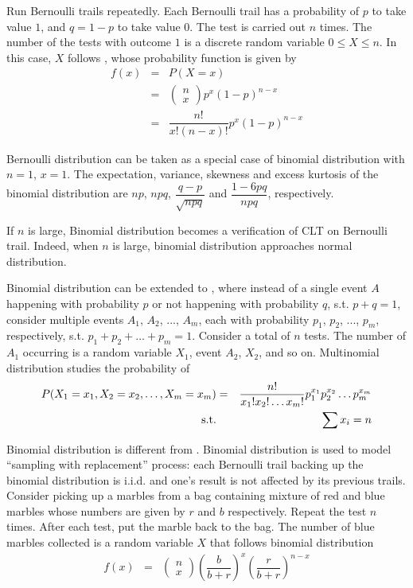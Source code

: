 Run Bernoulli trails repeatedly. Each Bernoulli trail has a probability of $p$ to take value $1$, and $q=1-p$ to take value $0$. The test is carried out $n$ times. The number of the tests with outcome $1$ is a discrete random variable $0\leq X \leq n$. In this case, $X$ follows , whose probability function is given by
\begin{eqnarray}
  f(x) &=& P(X=x) \nonumber \\
  &=& \left(\begin{array}{c}
              n \\
              x
            \end{array}\right)p^x(1-p)^{n-x} \nonumber \\
  &=& \dfrac{n!}{x!(n-x)!}p^x(1-p)^{n-x}
\end{eqnarray}

Bernoulli distribution can be taken as a special case of binomial distribution with $n=1$, $x=1$. The expectation, variance, skewness and excess kurtosis of the binomial distribution are $np$, $npq$, $\dfrac{q-p}{\sqrt{npq}}$ and $\dfrac{1-6pq}{npq}$, respectively.

If $n$ is large, Binomial distribution becomes a verification of CLT on Bernoulli trail. Indeed, when $n$ is large, binomial distribution approaches normal distribution.

Binomial distribution can be extended to , where instead of a single event $A$ happening with probability $p$ or not happening with probability $q$, s.t. $p+q=1$, consider multiple events $A_1$, $A_2$, ..., $A_m$, each with probability $p_1$, $p_2$, ..., $p_m$, respectively, s.t. $p_1+p_2+\ldots+p_m=1$. Consider a total of $n$ tests. The number of $A_1$ occurring is a random variable $X_1$, event $A_2$, $X_2$, and so on. Multinomial distribution studies the probability of
\begin{eqnarray}
  P(X_1=x_1, X_2=x_2,\ldots, X_m = x_m) &=& \dfrac{n!}{x_1!x_2!\ldots x_m!}p_1^{x_1}p_2^{x_2}\ldots p_m^{x_m} \nonumber \\
  \textup{s.t.} && \sum x_i = n \nonumber
\end{eqnarray}

Binomial distribution is different from . Binomial distribution is used to model ``sampling with replacement'' process: each Bernoulli trail backing up the binomial distribution is i.i.d. and one's result is not affected by its previous trails. Consider picking up a marbles from a bag containing mixture of red and blue marbles whose numbers are given by $r$ and $b$ respectively. Repeat the test $n$ times. After each test, put the marble back to the bag. The number of blue marbles collected is a random variable $X$ that follows binomial distribution
\begin{eqnarray}
f(x) &=& \left(\begin{array}{c}
                        n \\
                        x
                      \end{array}\right)\left(\dfrac{b}{b+r}\right)^x\left(\dfrac{r}{b+r}\right)^{n-x} \nonumber \nonumber
\end{eqnarray}

